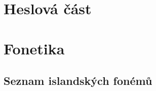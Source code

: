 
\chapter{Heslová část}
\clearpage

\fi


\ifinputletters

\cleardoublepage

\dictionarygeometry
\pagestyle{myheadings}





\restoregeometry
\pagestyle{plain}

\fi


\ifinputphon

\cleardoublepage

\chapter{Fonetika}                               \label{sec:phon}

\section{Seznam islandských fonémů}              \label{sec:phon_phonems}

\clearpage


\fi

